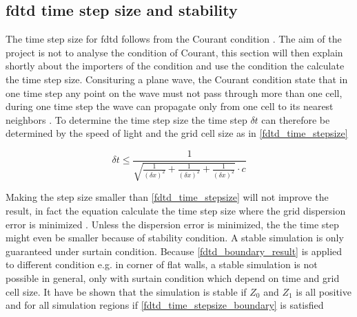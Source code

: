          \startexplain
    \stopexplain

\subsection{\gls{fdtd} time step size and stability}   \label{sec:fdtd_time_stepsize} 
The time step size for \gls{fdtd} follows from the Courant condition \citep{Kunz1993}. The aim of the project is not to analyse the condition of Courant, this section will then explain shortly about the importers of the condition and use the condition the calculate the time step size. Consituring a plane wave, the Courant condition state that in one time step any point on the wave must not pass through more than one cell, during one time step the wave can propagate only from one cell to its nearest neighbors \citep{Kunz1993}. To determine the time step size the time step $\delta t $ can therefore be determined by the speed of light and the grid cell size as in \autoref{fdtd_time_stepsize}



\begin{equation}\label{fdtd_time_stepsize}
\delta t \leq \frac{1}{\sqrt{\frac{1}{(\delta x)^2}+\frac{1}{(\delta x)^2}+\frac{1}{(\delta x)^2} }\cdot c}
\end{equation}
        \startexplain
    \stopexplain
    
Making the step size smaller than \autoref{fdtd_time_stepsize} will not improve the result, in fact the equation calculate the time step size where the grid dispersion error is minimized \citep{Kunz1993}. Unless the dispersion error is minimized, the the time step might even be  smaller because of stability condition. 
A stable simulation is only guaranteed under surtain condition. Because \autoref{fdtd_boundary_result} is applied to different condition e.g. in corner of flat walls, a stable simulation is not possible in general, only with surtain condition which depend on time and grid cell size. It have be shown that the simulation is stable if $Z_0$ and $Z_{1}$ is all positive and for all simulation regions if \autoref{fdtd_time_stepsize_boundary} is satisfied

